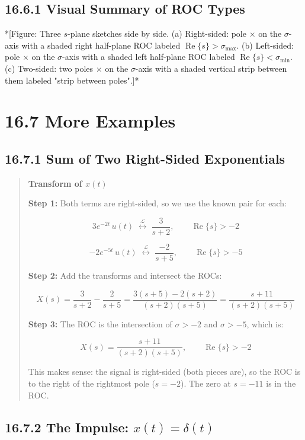 \documentclass[11pt]{article}
\begin{document}
\subsection*{16.6.1 Visual Summary of ROC Types}

*[Figure: Three $s$-plane sketches side by side.
(a) Right-sided: pole $\times$ on the $\sigma$-axis with a shaded right half-plane ROC labeled $\operatorname{Re}\{s\} > \sigma_{\max}$.
(b) Left-sided: pole $\times$ on the $\sigma$-axis with a shaded left half-plane ROC labeled $\operatorname{Re}\{s\} < \sigma_{\min}$.
(c) Two-sided: two poles $\times$ on the $\sigma$-axis with a shaded vertical strip between them labeled "strip between poles".]*

\section*{16.7 More Examples}

\subsection*{16.7.1 Sum of Two Right-Sided Exponentials}

\begin{quote}
\textbf{Transform of $x(t)$}

\textbf{Step 1:} Both terms are right-sided, so we use the known pair for each:

\[3e^{-2t}\,u(t) \;\overset{\mathcal{L}}{\longleftrightarrow}\; \frac{3}{s+2}, \qquad \operatorname{Re}\{s\} > -2\]

\[-2e^{-5t}\,u(t) \;\overset{\mathcal{L}}{\longleftrightarrow}\; \frac{-2}{s+5}, \qquad \operatorname{Re}\{s\} > -5\]

\textbf{Step 2:} Add the transforms and intersect the ROCs:

\[X(s) = \frac{3}{s+2} - \frac{2}{s+5} = \frac{3(s+5) - 2(s+2)}{(s+2)(s+5)} = \frac{s + 11}{(s+2)(s+5)}\]

\textbf{Step 3:} The ROC is the intersection of $\sigma > -2$ and $\sigma > -5$, which is:

\[\boxed{\,X(s) = \frac{s+11}{(s+2)(s+5)}, \qquad \operatorname{Re}\{s\} > -2\,}\]

This makes sense: the signal is right-sided (both pieces are), so the ROC is to the right of the rightmost pole ($s = -2$). The zero at $s = -11$ is in the ROC.
\end{quote}

\subsection*{16.7.2 The Impulse: $x(t) = \delta(t)$}
\end{document}

